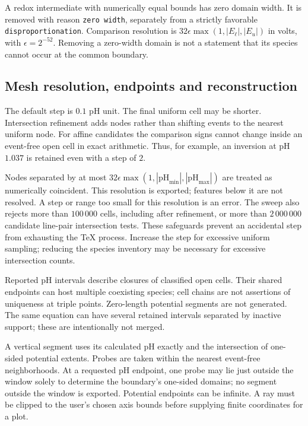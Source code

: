 \documentclass[a4paper,11pt]{ltxdoc}
\begin{document}
A redox intermediate with numerically equal bounds has zero domain width.
It is removed with reason \texttt{zero width}, separately from a strictly
favorable \texttt{disproportionation}. Comparison resolution is
$32\epsilon\max(1,|E_\ell|,|E_u|)$ in volts, with
$\epsilon=2^{-52}$. Removing a zero-width domain is not a statement that its
species cannot occur at the common boundary.

\subsection{Mesh resolution, endpoints and reconstruction}
The default step is $0.1$ pH unit. The final uniform cell may be shorter.
Intersection refinement adds nodes rather than shifting events to the nearest
uniform node. For affine candidates the comparison signs cannot change inside
an event-free open cell in exact arithmetic. Thus, for example, an inversion at
pH $1.037$ is retained even with a step of $2$.

Nodes separated by at most
$32\epsilon\max(1,|\mathrm{pH}_{\min}|,|\mathrm{pH}_{\max}|)$ are treated as
numerically coincident. This resolution is exported; features below it are not
resolved. A step or range too small for this resolution is an error. The sweep
also rejects more than $100\,000$ cells, including after refinement, or more
than $2\,000\,000$ candidate line-pair intersection tests. These safeguards
prevent an accidental step from exhausting the TeX process. Increase the step
for excessive uniform sampling; reducing the species inventory may be necessary
for excessive intersection counts.

Reported pH intervals describe closures of classified open cells. Their shared
endpoints can host multiple coexisting species; cell chains are not assertions
of uniqueness at triple points. Zero-length potential segments are not generated.
The same equation can have several retained intervals separated by inactive
support; these are intentionally not merged.

A vertical segment uses its calculated pH exactly and the intersection of
one-sided potential extents. Probes are taken within the nearest event-free
neighborhoods. At a requested pH endpoint, one probe may lie just outside the
window solely to determine the boundary's one-sided domains; no segment outside
the window is exported. Potential endpoints can be infinite. A ray must be
clipped to the user's chosen axis bounds before supplying finite coordinates
for a plot.
\end{document}
